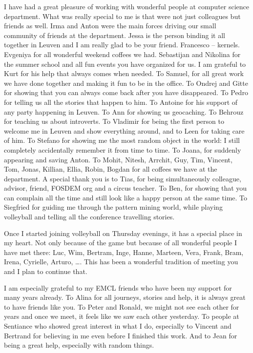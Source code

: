 I have had a great pleasure of working with wonderful people at computer science department. What was really special to me is that were not just colleagues but friends as well. Irma and Anton were the main forces driving our small community of friends at the department. Jessa is the person binding it all together in Leuven and I am really glad to be your friend. Francesco -- kernels. Evgeniya for all wonderful weekend coffees we had. Sebastijan and Nikolina for the summer school and all fun events you have organized for us. I am grateful to Kurt for his help that always comes when needed. To Samuel, for all great work we have done together and making it fun to be in the office. To Ondrej and Gitte for showing that you can always come back after you have disappeared. To Pedro for telling us all the stories that happen to him. To Antoine for his support of any party happening in Leuven. To Ann for showing us geocaching. To Behrouz for teaching us about introverts. To Vladimir for being the first person to welcome me in Leuven and show everything around, and to Leen for taking care of him. To Stefano for showing me the most random object in the world: I still completely accidentally remember it from time to time. To Joana, for suddenly appearing and saving Anton. To Mohit, Nitesh, Arrchit, Guy, Tim, Vincent, Tom, Jonas, Killian, Ellia, Robin, Bogdan for all coffees we have at the department. A special thank you is to Tias, for being simultaneously colleague, advisor, friend, FOSDEM org and a circus teacher. To Ben, for showing that you can complain all the time and still look like a happy person at the same time. To Siegfried for guiding me through the pattern mining world, while playing volleyball and telling all the conference travelling stories.

Once I started joining volleyball on Thursday evenings, it has a special place in my heart. Not only because of the game but because of all wonderful people I have met there: Luc, Wim, Bertram, Inge, Hanne, Marteen, Vera, Frank, Bram, Irena, Cyrielle, Arturo, \dots . This has been a wonderful tradition of meeting you and I plan to continue that. 

I am especially grateful to my EMCL friends who have been my support for many years already. To Alina for all journeys, stories and help, it is always great to have friends like you. To Peter and Ronald, we might not see each other for years and once we meet, it feels like we saw each other yesterday. 
To people at Sentiance who showed great interest in what I do, especially to Vincent and Bertrand for believing in me even before I finished this work. And to Jean for being a great help, especially with random things.

